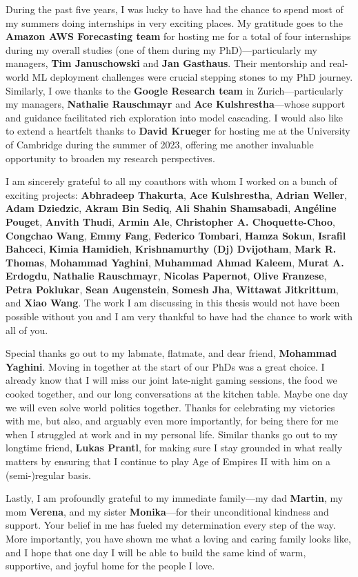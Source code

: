 During the past five years, I was lucky to have had the chance to spend most of my summers doing internships in very exciting places. My gratitude goes to the \textbf{Amazon AWS Forecasting team} for hosting me for a total of four internships during my overall studies (one of them during my PhD)—particularly my managers, \textbf{Tim Januschowski} and \textbf{Jan Gasthaus}. Their mentorship and real-world ML deployment challenges were crucial stepping stones to my PhD journey. Similarly, I owe thanks to the \textbf{Google Research team} in Zurich—particularly my managers, \textbf{Nathalie Rauschmayr} and \textbf{Ace Kulshrestha}—whose support and guidance facilitated rich exploration into model cascading. I would also like to extend a heartfelt thanks to \textbf{David Krueger} for hosting me at the University of Cambridge during the summer of 2023, offering me another invaluable opportunity to broaden my research perspectives.

I am sincerely grateful to all my coauthors with whom I worked on a bunch of exciting projects: \textbf{Abhradeep Thakurta}, \textbf{Ace Kulshrestha}, \textbf{Adrian Weller}, \textbf{Adam Dziedzic}, \textbf{Akram Bin Sediq}, \textbf{Ali Shahin Shamsabadi}, \textbf{Angéline Pouget}, \textbf{Anvith Thudi}, \textbf{Armin Ale}, \textbf{Christopher A. Choquette-Choo}, \textbf{Congchao Wang}, \textbf{Emmy Fang}, \textbf{Federico Tombari}, \textbf{Hamza Sokun}, \textbf{Israfil Bahceci}, \textbf{Kimia Hamidieh}, \textbf{Krishnamurthy (Dj) Dvijotham}, \textbf{Mark R. Thomas}, \textbf{Mohammad Yaghini}, \textbf{Muhammad Ahmad Kaleem}, \textbf{Murat A. Erdogdu}, \textbf{Nathalie Rauschmayr}, \textbf{Nicolas Papernot}, \textbf{Olive Franzese}, \textbf{Petra Poklukar}, \textbf{Sean Augenstein}, \textbf{Somesh Jha}, \textbf{Wittawat Jitkrittum}, and \textbf{Xiao Wang}. The work I am discussing in this thesis would not have been possible without you and I am very thankful to have had the chance to work with all of you. 

Special thanks go out to my labmate, flatmate, and dear friend, \textbf{Mohammad Yaghini}. Moving in together at the start of our PhDs was a great choice. I already know that I will miss our joint late-night gaming sessions, the food we cooked together, and our long conversations at the kitchen table. Maybe one day we will even solve world politics together. Thanks for celebrating my victories with me, but also, and arguably even more importantly, for being there for me when I struggled at work and in my personal life. Similar thanks go out to my longtime friend, \textbf{Lukas Prantl}, for making sure I stay grounded in what really matters by ensuring that I continue to play Age of Empires II with him on a (semi-)regular basis. 

Lastly, I am profoundly grateful to my immediate family—my dad \textbf{Martin}, my mom \textbf{Verena}, and my sister \textbf{Monika}—for their unconditional kindness and support. Your belief in me has fueled my determination every step of the way. More importantly, you have shown me what a loving and caring family looks like, and I hope that one day I will be able to build the same kind of warm, supportive, and joyful home for the people I love. 
